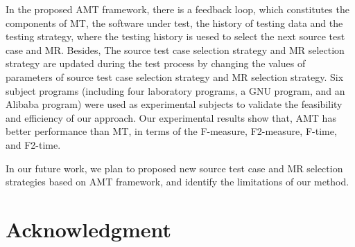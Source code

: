 \documentclass[10pt,journal,compsoc]{IEEEtran}
\begin{document}
In the proposed AMT framework, there is a feedback loop, which constitutes the components of MT, the software under
test, the history of testing data and the testing strategy, where the testing history is uesed to select the next source test case and MR. Besides, The source test case selection strategy and MR selection strategy are updated during the test process by changing the values of parameters of source test case selection strategy and MR selection strategy. Six subject programs (including four laboratory programs, a GNU program, and an Alibaba program) were used as experimental subjects to validate the feasibility and efficiency of our approach. Our experimental results show that, AMT has better performance than MT, in terms of the F-measure, F2-measure, F-time, and F2-time.

In our future work, we plan to proposed new source test case and MR selection strategies based on AMT framework, and identify the limitations of our method. 


\section*{Acknowledgment}
\end{document}
